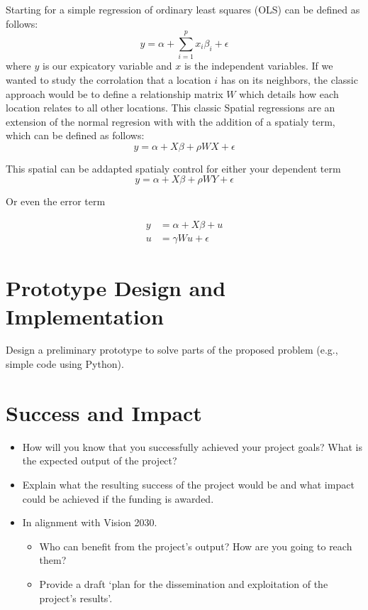 \documentclass{article}
\begin{document}
Starting for a simple regression of ordinary least squares (OLS) can be defined as follows:
\begin{equation}
  y = \alpha + \sum^p_{i=1} x_i \beta_i + \epsilon
  \label{eq:OLS}
\end{equation}
where $y$ is our expicatory variable and $x$ is the independent variables. If we wanted to study the corrolation that a location $i$ has on its neighbors, the classic approach would be 
to define a relationship matrix $W$ which details how each location relates to all other locations. This classic Spatial regressions are an extension of the normal regresion with with 
the addition of a spatialy term, which can be defined as follows:
\begin{equation}
	y = \alpha + X \beta + \rho W X + \epsilon
	\label{eq:SDM}
\end{equation}

This spatial can be addapted spatialy control for either your dependent term
\begin{equation}
	y = \alpha + X \beta + \rho W Y + \epsilon
	\label{eq:SAR}
\end{equation}

Or even the error term

\begin{equation}
	\begin{split}
		y & =\alpha + X \beta + u  \\
		u & =\gamma W u + \epsilon
	\end{split}
	\label{eq:SEM}
\end{equation}

\section{Prototype Design and Implementation}
Design a preliminary prototype to solve parts of the proposed problem (e.g., simple code using Python).

\section{Success and Impact}
\begin{itemize}
	\item How will you know that you successfully achieved your project goals? What is the expected output of the project?
	\item Explain what the resulting success of the project would be and what impact could be achieved if the funding is awarded.
	\item In alignment with Vision 2030.
	      \begin{itemize}
		      \item Who can benefit from the project's output? How are you going to reach them?
		      \item Provide a draft ‘plan for the dissemination and exploitation of the project's results’.
	      \end{itemize}
\end{itemize}





\end{document}
